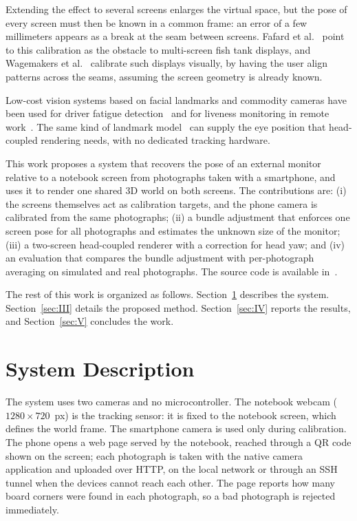 \documentclass[english,hidelinks]{sbrt}
\begin{document}
Extending the effect to several screens enlarges the virtual space, but the pose of every screen must then be known in a common frame: an error of a few millimeters appears as a break at the seam between screens. Fafard et al.~\cite{fafard2017calibration} point to this calibration as the obstacle to multi-screen fish tank displays, and Wagemakers et al.~\cite{wagemakers2017interactive} calibrate such displays visually, by having the user align patterns across the seams, assuming the screen geometry is already known.

Low-cost vision systems based on facial landmarks and commodity cameras have been used for driver fatigue detection~\cite{assumpcao2025fatigue} and for liveness monitoring in remote work~\cite{gama2025liveness}. The same kind of landmark model~\cite{grishchenko2020attention} can supply the eye position that head-coupled rendering needs, with no dedicated tracking hardware.

This work proposes a system that recovers the pose of an external monitor relative to a notebook screen from photographs taken with a smartphone, and uses it to render one shared 3D world on both screens. The contributions are: (i) the screens themselves act as calibration targets, and the phone camera is calibrated from the same photographs; (ii) a bundle adjustment that enforces one screen pose for all photographs and estimates the unknown size of the monitor; (iii) a two-screen head-coupled renderer with a correction for head yaw; and (iv) an evaluation that compares the bundle adjustment with per-photograph averaging on simulated and real photographs. The source code is available in~\cite{parallax2026repo}.

The rest of this work is organized as follows. Section~\ref{sec:II} describes the system. Section~\ref{sec:III} details the proposed method. Section~\ref{sec:IV} reports the results, and Section~\ref{sec:V} concludes the work.

\section{System Description}
\label{sec:II}

The system uses two cameras and no microcontroller. The notebook webcam ($1280\times720$~px) is the tracking sensor: it is fixed to the notebook screen, which defines the world frame. The smartphone camera is used only during calibration. The phone opens a web page served by the notebook, reached through a QR code shown on the screen; each photograph is taken with the native camera application and uploaded over HTTP, on the local network or through an SSH tunnel when the devices cannot reach each other. The page reports how many board corners were found in each photograph, so a bad photograph is rejected immediately.
\end{document}
